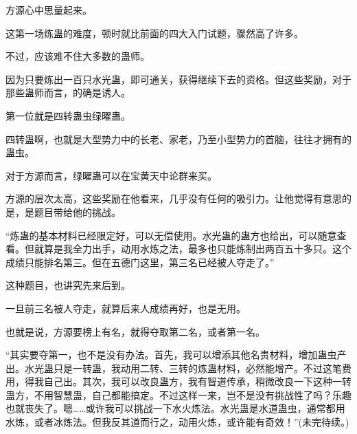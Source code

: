 \begin{this_body}
方源心中思量起来。

这第一场炼蛊的难度，顿时就比前面的四大入门试题，骤然高了许多。

不过，应该难不住大多数的蛊师。

因为只要炼出一百只水光蛊，即可通关，获得继续下去的资格。但这些奖励，对于那些蛊师而言，的确是诱人。

第一位就是四转蛊虫绿曜蛊。

四转蛊啊，也就是大型势力中的长老、家老，乃至小型势力的首脑，往往才拥有的蛊虫。

对于方源而言，绿曜蛊可以在宝黄天中论群来买。

方源的层次太高，这些奖励在他看来，几乎没有任何的吸引力。让他觉得有意思的是，是题目带给他的挑战。

“炼蛊的基本材料已经限定好，可以无偿使用。水光蛊的蛊方也给出，可以随意查看。但就算是我全力出手，动用水炼之法，最多也只能炼制出两百五十多只。这个成绩只能排名第三。但在五德门这里，第三名已经被人夺走了。”

这种题目，也讲究先来后到。

一旦前三名被人夺走，就算后来人成绩再好，也是无用。

也就是说，方源要榜上有名，就得夺取第二名，或者第一名。

“其实要夺第一，也不是没有办法。首先，我可以增添其他名贵材料，增加蛊虫产出。水光蛊只是一转蛊，我动用二转、三转的炼蛊材料，必然能增产。不过这笔费用，得我自己出。其次，我可以改良蛊方，我有智道传承，稍微改良一下这种一转蛊方，不用智慧蛊，自己都能搞定。不过这样一来，岂不是没有挑战性了吗？乐趣也就丧失了。嗯……或许我可以挑战一下水火炼法。水光蛊是水道蛊虫，通常都用水炼，或者冰炼法。但我反其道而行之，动用火炼，或许能有奇效！”(未完待续。)

\end{this_body}

